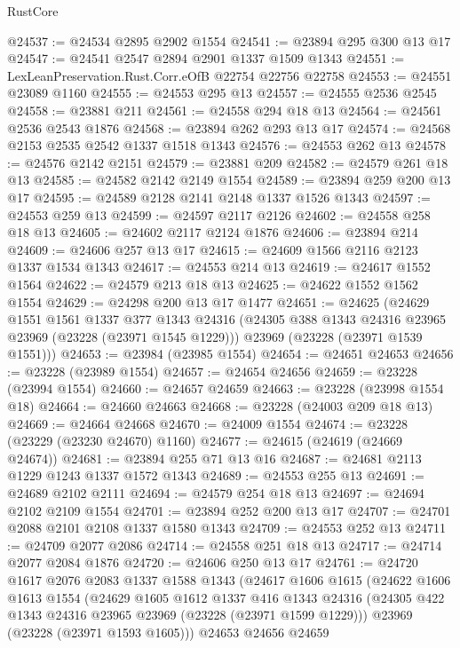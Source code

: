 \begin{lexlean}{RustCore}
\begin{coremodule}
@24537 := @24534 @2895 @2902 @1554
@24541 := @23894 @295 @300 @13 @17
@24547 := @24541 @2547 @2894 @2901 @1337 @1509 @1343
@24551 := LexLeanPreservation.Rust.Corr.eOfB @22754 @22756 @22758
@24553 := @24551 @23089 @1160
@24555 := @24553 @295 @13
@24557 := @24555 @2536 @2545
@24558 := @23881 @211
@24561 := @24558 @294 @18 @13
@24564 := @24561 @2536 @2543 @1876
@24568 := @23894 @262 @293 @13 @17
@24574 := @24568 @2153 @2535 @2542 @1337 @1518 @1343
@24576 := @24553 @262 @13
@24578 := @24576 @2142 @2151
@24579 := @23881 @209
@24582 := @24579 @261 @18 @13
@24585 := @24582 @2142 @2149 @1554
@24589 := @23894 @259 @200 @13 @17
@24595 := @24589 @2128 @2141 @2148 @1337 @1526 @1343
@24597 := @24553 @259 @13
@24599 := @24597 @2117 @2126
@24602 := @24558 @258 @18 @13
@24605 := @24602 @2117 @2124 @1876
@24606 := @23894 @214
@24609 := @24606 @257 @13 @17
@24615 := @24609 @1566 @2116 @2123 @1337 @1534 @1343
@24617 := @24553 @214 @13
@24619 := @24617 @1552 @1564
@24622 := @24579 @213 @18 @13
@24625 := @24622 @1552 @1562 @1554
@24629 := @24298 @200 @13 @17 @1477
@24651 := @24625
    (@24629
      @1551
      @1561
      @1337
      @377
      @1343
      @24316
      (@24305 @388 @1343 @24316 @23965 @23969 (@23228 (@23971 @1545 @1229)))
      @23969
      (@23228 (@23971 @1539 @1551)))
@24653 := @23984 (@23985 @1554)
@24654 := @24651 @24653
@24656 := @23228 (@23989 @1554)
@24657 := @24654 @24656
@24659 := @23228 (@23994 @1554)
@24660 := @24657 @24659
@24663 := @23228 (@23998 @1554 @18)
@24664 := @24660 @24663
@24668 := @23228 (@24003 @209 @18 @13)
@24669 := @24664 @24668
@24670 := @24009 @1554
@24674 := @23228 (@23229 (@23230 @24670) @1160)
@24677 := @24615 (@24619 (@24669 @24674))
@24681 := @23894 @255 @71 @13 @16
@24687 := @24681 @2113 @1229 @1243 @1337 @1572 @1343
@24689 := @24553 @255 @13
@24691 := @24689 @2102 @2111
@24694 := @24579 @254 @18 @13
@24697 := @24694 @2102 @2109 @1554
@24701 := @23894 @252 @200 @13 @17
@24707 := @24701 @2088 @2101 @2108 @1337 @1580 @1343
@24709 := @24553 @252 @13
@24711 := @24709 @2077 @2086
@24714 := @24558 @251 @18 @13
@24717 := @24714 @2077 @2084 @1876
@24720 := @24606 @250 @13 @17
@24761 := @24720
    @1617
    @2076
    @2083
    @1337
    @1588
    @1343
    (@24617
      @1606
      @1615
      (@24622
        @1606
        @1613
        @1554
        (@24629
          @1605
          @1612
          @1337
          @416
          @1343
          @24316
          (@24305 @422 @1343 @24316 @23965 @23969 (@23228 (@23971 @1599 @1229)))
          @23969
          (@23228 (@23971 @1593 @1605)))
        @24653
        @24656
        @24659

\end{coremodule}
\end{lexlean}
